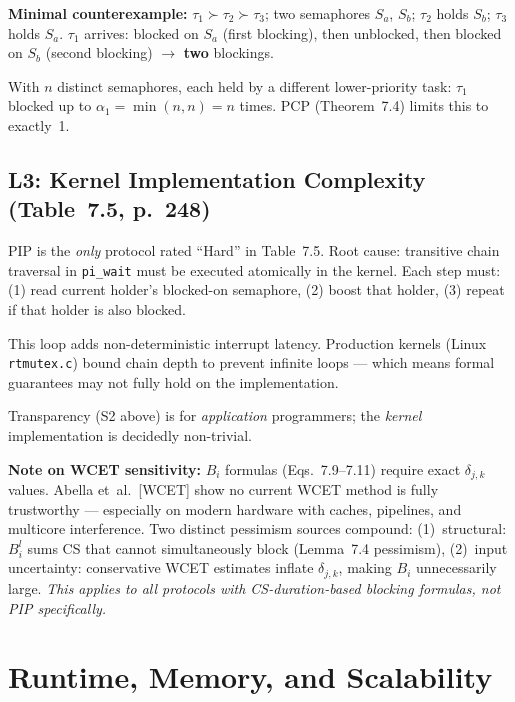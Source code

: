 \documentclass[conference,onecolumn]{IEEEtran}
\begin{document}
\textbf{Minimal counterexample:}
$\tau_1 \succ \tau_2 \succ \tau_3$; two semaphores $S_a$, $S_b$;
$\tau_2$ holds $S_b$; $\tau_3$ holds $S_a$.
$\tau_1$ arrives: blocked on $S_a$ (first blocking), then unblocked,
then blocked on $S_b$ (second blocking) $\to$ \textbf{two} blockings.

With $n$ distinct semaphores, each held by a different lower-priority task:
$\tau_1$ blocked up to $\alpha_1 = \min(n, n) = n$ times.
PCP (Theorem~7.4) limits this to exactly~1.

\subsection{L3: Kernel Implementation Complexity (Table~7.5, p.~248)}

PIP is the \emph{only} protocol rated ``Hard'' in Table~7.5.
Root cause: transitive chain traversal in \texttt{pi\_wait} must be
executed atomically in the kernel. Each step must:
(1) read current holder's blocked-on semaphore,
(2) boost that holder,
(3) repeat if that holder is also blocked.

This loop adds non-deterministic interrupt latency.
Production kernels (Linux \texttt{rtmutex.c}) bound chain depth
to prevent infinite loops --- which means formal guarantees may not
fully hold on the implementation.

Transparency (S2 above) is for \emph{application} programmers;
the \emph{kernel} implementation is decidedly non-trivial.

\textbf{Note on WCET sensitivity:}
$B_i$ formulas (Eqs.~7.9--7.11) require exact $\delta_{j,k}$ values.
Abella et~al.~[WCET] show no current WCET method is fully trustworthy
--- especially on modern hardware with caches, pipelines, and multicore
interference. Two distinct pessimism sources compound:
(1)~structural: $B_i^l$ sums CS that cannot simultaneously block
(Lemma~7.4 pessimism), (2)~input uncertainty: conservative WCET
estimates inflate $\delta_{j,k}$, making $B_i$ unnecessarily large.
\emph{This applies to all protocols with CS-duration-based blocking
formulas, not PIP specifically.}

\section{Runtime, Memory, and Scalability}
\end{document}

